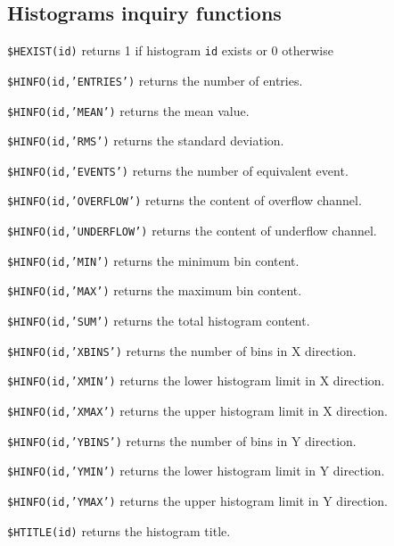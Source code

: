 \subsection{Histograms inquiry functions}
\begin{UL}
\item\texttt{\$HEXIST(id)} returns 1 if histogram \texttt{id} exists or 0 otherwise
\item\texttt{\$HINFO(id,'ENTRIES')} returns the number of entries.
\item\texttt{\$HINFO(id,'MEAN')} returns the mean value.
\item\texttt{\$HINFO(id,'RMS')} returns the standard deviation.
\item\texttt{\$HINFO(id,'EVENTS')} returns the number of equivalent event.
\item\texttt{\$HINFO(id,'OVERFLOW')} returns the content of overflow channel.
\item\texttt{\$HINFO(id,'UNDERFLOW')} returns the content of underflow channel.
\item\texttt{\$HINFO(id,'MIN')} returns the minimum bin content.
\item\texttt{\$HINFO(id,'MAX')} returns the maximum bin content.
\item\texttt{\$HINFO(id,'SUM')} returns the total histogram content.
\item\texttt{\$HINFO(id,'XBINS')} returns the number of bins in X direction.
\item\texttt{\$HINFO(id,'XMIN')} returns the lower histogram limit in X direction.
\item\texttt{\$HINFO(id,'XMAX')} returns the upper histogram limit in X direction.
\item\texttt{\$HINFO(id,'YBINS')} returns the number of bins in Y direction.
\item\texttt{\$HINFO(id,'YMIN')} returns the lower histogram limit in Y direction.
\item\texttt{\$HINFO(id,'YMAX')} returns the upper histogram limit in Y direction.
\item\texttt{\$HTITLE(id)} returns the histogram title.
\end{UL}

